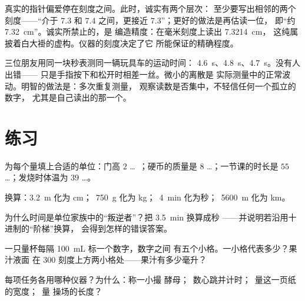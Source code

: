 \begin{remark}[刻度之间]\label{rem:g6:measurement-in-science:between}
真实的指针偏爱停在刻度之间。此时，诚实有两个层次：
至少要写出相邻的两个刻度——“介于 $7.3$ 和
$7.4$ 之间，更接近 $7.3$”；更好的做法是再估读一位，
即“约 \qty{7.32}{cm}”。诚实所禁止的，是
编造精度：在毫米刻度上读出 \qty{7.3214}{cm}，
这纯属披着白大褂的虚构。仪器的刻度决定了它
所能保证的精确程度。
\end{remark}

\begin{example}\label{ex:g6:measurement-in-science:repeat}
三位朋友用同一块秒表测同一辆玩具车的运动时间：
\qty{4.6}{s}、\qty{4.8}{s}、\qty{4.7}{s}。没有人出错——
只是手指按下和松开时相差一丝。微小的离散是
实际测量中的正常波动。明智的做法是：多次重复测量，
观察读数是否集中，不轻信任何一个孤立的数字，
尤其是自己读出的那一个。
\end{example}

\section{练习}

\begin{exercise}[$\star$]\label{exo:g6:measurement-in-science:1}
为每个量填上合适的单位：门高 $2$
\dots\ ；硬币的质量是 $8$ \dots；一节课的时长是
$55$ \dots；发烧时体温为 $39$ \dots。
\end{exercise}

\begin{exercise}[$\star$]\label{exo:g6:measurement-in-science:2}
换算：\qty{3.2}{m} 化为 \unit{cm}；\ \qty{750}{g} 化为 \unit{kg}；\
\qty{4}{min} 化为秒；\ \qty{5600}{m} 化为 \unit{km}。
\end{exercise}

\begin{exercise}[$\star$]\label{exo:g6:measurement-in-science:3}
为什么时间是单位家族中的“叛逆者”？把 \qty{3.5}{min} 换算成秒
——并说明若沿用十进制的“阶梯”换算，
会得到怎样的错误答案。
\end{exercise}

\begin{exercise}[$\star$]\label{exo:g6:measurement-in-science:4}
一只量杯每隔 \qty{100}{mL} 标一个数字，数字之间
有五个小格。一小格代表多少？果汁液面
在 $300$ 刻度上方两小格处——果汁有多少毫升？
\end{exercise}

\begin{exercise}[$\star$]\label{exo:g6:measurement-in-science:5}
每项任务各用哪种仪器？为什么：称一小撮
酵母；\ 数心跳并计时；\ 量这一页纸的宽度；\ 量
操场的长度？
\end{exercise}

